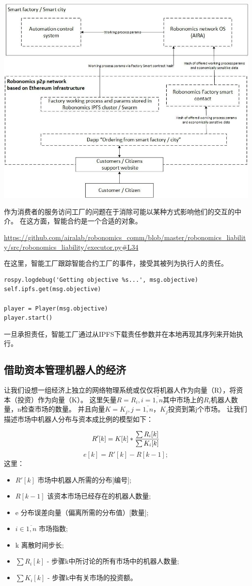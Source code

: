 \documentclass[UTF8]{article}
\begin{document}
\includegraphics[width=1\textwidth]{app-2.png} 

作为消费者的服务访问工厂的问题在于消除可能以某种方式影响他们的交互的中介。 在这方面，智能合约是一个合适的对象。

\url{https://github.com/airalab/robonomics_comm/blob/master/robonomics_liability/src/robonomics_liability/executor.py#L34}

在这里，智能工厂跟踪智能合约工厂的事件，接受其被列为执行人的责任。

\begin{lstlisting}
rospy.logdebug('Getting objective %s...', msg.objective)
self.ipfs.get(msg.objective)

player = Player(msg.objective)
player.start()
\end{lstlisting}

一旦承担责任，智能工厂通过从IPFS下载责任参数并在本地再现其序列来开始执行。

\subsection{借助资本管理机器人的经济}

让我们设想一组经济上独立的网络物理系统或仅仅将机器人作为向量（R），将资本（投资）作为向量（K）。 这里矢量$ R = {R_i, i=\overline{1,n}}$其中市场上的$R_i$机器人数量，n检查市场的数量。 并且向量$ K = {K_j, j=\overline{1,n}} $，$K_j$投资到第j个市场。 让我们描述市场中机器人分布与资本成比例的模型如下：

\[
R'[k] = K[k] * { \sum R_i[k] \over \sum K_i[k] }
\]
\[
e[k] = R'[k] - R[k-1] ;
\]
这里：
\begin{itemize}
\item $R'[k]$ 市场中机器人所需的分布[编号];
\item $R[k-1]$ 该资本市场已经存在的机器人数量;
\item e 分布误差向量（偏离所需的分布值）[数量];
\item $i \in \overline{1,n}$  市场指数;
\item k 离散时间步长;
\item $\sum R_i[k] $ - 步骤k中所讨论的所有市场中的机器人数量;
\item $\sum K_i[k] $ - 步骤k中有关市场的投资额。
\end{itemize}
\end{document}

